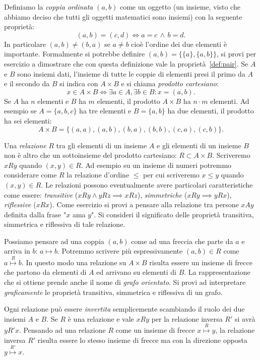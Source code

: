 \documentclass[italian,a4paper,hidelinks,headinclude]{scrartcl}
\newcommand{\myemph}[1]{\emph{#1}\marginpar{#1}}
\begin{document}
Definiamo la \myemph{coppia ordinata} $(a,b)$ come un oggetto (un insieme,
visto che abbiamo deciso che tutti gli oggetti matematici sono insiemi) con
la seguente proprietà:
\begin{equation}\label{def:pair}
  (a,b) = (c,d) \iff a=c\, \wedge \,b=d.
\end{equation}
In particolare $(a,b) \neq (b,a)$ se $a\neq b$ cioè l'ordine dei due elementi
è importante.
Formalmente si potrebbe definire $(a,b)=\{\{a\}, \{a,b\}\}$,
si provi per esercizio a dimostrare che con questa definizione vale la
proprietà~\eqref{def:pair}.
Se $A$ e $B$ sono insiemi dati, l'insieme di tutte le coppie di elementi
presi il primo da $A$ e il secondo da $B$ si indica con $A \times B$ e si chiama
\myemph{prodotto cartesiano}:
\[
x \in A \times B \iff \exists a \in A, \exists b \in B\colon x = (a,b).
\]
Se $A$ ha $n$ elementi e $B$ ha $m$ elementi, il prodotto $A\times B$ ha $n\cdot m$
elementi. Ad esempio se $A=\{a,b,c\}$ ha tre elementi e $B=\{a,b\}$ ha due elementi,
il prodotto ha sei elementi:
\[
  A \times B = \{(a,a), (a,b), (b,a), (b,b), (c,a), (c,b)\}.
\]

Una \myemph{relazione} $R$ tra gli elementi di un insieme $A$
e gli elementi di un insieme $B$
non è altro che un sottoinsieme del prodotto cartesiano: $R\subset A \times B$.
Scriveremo $x R y$ quando $(x,y) \in R$.
Ad esempio su un insieme di numeri potremmo considerare come $R$ la relazione d'ordine
$\le$ per cui scriveremo $x \le y$ quando $(x,y)\in R$.
Le relazioni possono eventualmente avere particolari caratteristiche
come essere: \emph{transitive} ($xRy \wedge yR z \implies x R z$),
\emph{simmetriche} ($xRy \implies yRx$),
\emph{riflessive} ($xRx$).
Come esercizio si provi a pensare alla relazione tra persone $xAy$
definita dalla frase "$x$ ama $y$".
Si consideri il significato delle proprietà transitiva, simmetrica
e riflessiva di tale relazione.

Possiamo pensare ad una coppia $(a,b)$ come ad una freccia che
parte da $a$ e arriva in $b$: $a \mapsto b$.
Potremmo scrivere più espressivamente $(a,b)\in R$ come
$a \stackrel{R}\mapsto b$.
In questo modo una relazione su $A\times B$
risulta essere un insieme di frecce che partono da elementi di $A$
ed arrivano su elementi di $B$. La rappresentazione che si ottiene prende
anche il nome di \emph{grafo orientato}.
Si provi ad interpretare \emph{graficamente} le proprietà
transitiva, simmetrica e riflessiva di un grafo.

Ogni relazione può essere \emph{invertita}
semplicemente scambiando il ruolo
dei due insiemi $A$ e $B$. Se $R$ è una relazione e vale $x R y$
per la relazione inversa $R'$ si avrà
$y R' x$.
Pensando ad una relazione $R$ come un insieme di frecce
$x\stackrel R \mapsto y$,
la relazione inversa $R'$ risulta essere lo stesso insieme di frecce ma
con la direzione opposta $y\stackrel{R'} \mapsto x$.
\end{document}
